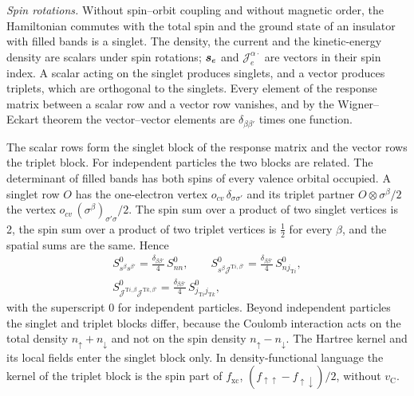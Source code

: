\emph{Spin rotations.} Without spin--orbit coupling and without magnetic order, the Hamiltonian commutes with the total spin and the ground state of an insulator with filled bands is a singlet. The density, the current and the kinetic-energy density are scalars under spin rotations; $\bm{s}_e$ and $\mathcal{J}^{\alpha\cdot}_e$ are vectors in their spin index. A scalar acting on the singlet produces singlets, and a vector produces triplets, which are orthogonal to the singlets. Every element of the response matrix between a scalar row and a vector row vanishes, and by the Wigner--Eckart theorem the vector--vector elements are $\delta_{\beta\beta'}$ times one function.

The scalar rows form the singlet block of the response matrix and the vector rows the triplet block. For independent particles the two blocks are related. The determinant of filled bands has both spins of every valence orbital occupied. A singlet row $O$ has the one-electron vertex $o_{cv}\,\delta_{\sigma\sigma'}$ and its triplet partner $O\otimes\sigma^\beta/2$ the vertex $o_{cv}\,(\sigma^\beta)_{\sigma'\sigma}/2$. The spin sum over a product of two singlet vertices is 2, the spin sum over a product of two triplet vertices is $\frac12$ for every $\beta$, and the spatial sums are the same. Hence
\begin{equation}
  \begin{gathered}
  S^0_{s^\beta s^{\beta'}} = \frac{\delta_{\beta\beta'}}{4}\,S^0_{nn} , \qquad S^0_{s^\beta\mathcal{J}^{\mathrm{T}i,\beta'}} = \frac{\delta_{\beta\beta'}}{4}\,S^0_{nj_{\mathrm{T}i}} , \\
  S^0_{\mathcal{J}^{\mathrm{T}i,\beta}\mathcal{J}^{\mathrm{T}k,\beta'}} = \frac{\delta_{\beta\beta'}}{4}\,S^0_{j_{\mathrm{T}i}j_{\mathrm{T}k}} ,
  \end{gathered}
  \label{eq:D.30-quarter}
\end{equation}
with the superscript 0 for independent particles. Beyond independent particles the singlet and triplet blocks differ, because the Coulomb interaction acts on the total density $n_\uparrow + n_\downarrow$ and not on the spin density $n_\uparrow - n_\downarrow$. The Hartree kernel and its local fields enter the singlet block only. In density-functional language the kernel of the triplet block is the spin part of $f_{\mathrm{xc}}$, $(f_{\uparrow\uparrow} - f_{\uparrow\downarrow})/2$, without $v_{\mathrm{C}}$.

